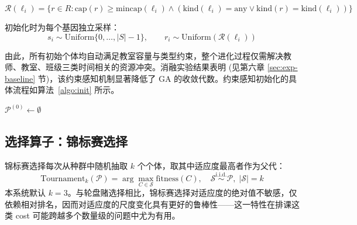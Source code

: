 \begin{equation}
  \mathcal{R}(\ell_i) = \{r \in R : \mathrm{cap}(r) \geq \mathrm{mincap}(\ell_i) \wedge (\mathrm{kind}(\ell_i) = \text{any} \vee \mathrm{kind}(r) = \mathrm{kind}(\ell_i))\}
\end{equation}

初始化时为每个基因独立采样：
\begin{equation}
  s_i \sim \mathrm{Uniform}\{0, \ldots, |S|-1\}, \qquad r_i \sim \mathrm{Uniform}(\mathcal{R}(\ell_i))
\end{equation}

由此，所有初始个体均自动满足教室容量与类型约束，整个进化过程仅需解决教师、教室、班级三类时间相关的资源冲突。消融实验结果表明 (见第六章 \ref{sec:exp-baseline} 节)，该约束感知机制显著降低了 GA 的收敛代数。约束感知初始化的具体流程如算法~\ref{algo:init} 所示。

\begin{algorithm}[!ht]
\caption{约束感知的随机初始化}\label{algo:init}
\DontPrintSemicolon
\SetAlgoLined
{}

$\mathcal{P}^{(0)} \leftarrow \emptyset$\;
\;
\end{algorithm}

\subsection{选择算子：锦标赛选择}

锦标赛选择每次从种群中随机抽取 $k$ 个个体，取其中适应度最高者作为父代：
\begin{equation}
  \mathrm{Tournament}_k(\mathcal{P}) = \arg\max_{C \in \mathcal{S}} \mathrm{fitness}(C), \quad \mathcal{S} \overset{\text{i.i.d.}}{\sim} \mathcal{P},\; |\mathcal{S}| = k
\end{equation}
本系统默认 $k = 3$。与轮盘赌选择相比，锦标赛选择对适应度的绝对值不敏感，仅依赖相对排名，因而对适应度的尺度变化具有更好的鲁棒性——这一特性在排课这类 cost 可能跨越多个数量级的问题中尤为有用。

